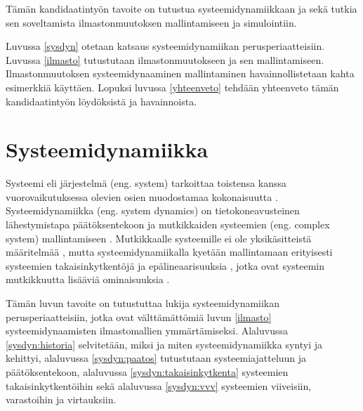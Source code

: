 \documentclass[finnish,12pt,a4paper,pdftex]{article}
\begin{document}
\begin{onehalfspacing}

Tämän kandidaatintyön tavoite on tutustua systeemidynamiikkaan ja sekä tutkia sen soveltamista ilmastonmuutoksen mallintamiseen ja simulointiin. 



Luvussa \ref{sysdyn} otetaan katsaus systeemidynamiikan perusperiaatteisiin. Luvussa \ref{ilmasto} tutustutaan ilmastonmuutokseen ja sen mallintamiseen. Ilmastonmuutoksen systeemidynaaminen mallintaminen havainnollistetaan kahta esimerkkiä käyttäen. Lopuksi luvussa \ref{yhteenveto} tehdään yhteenveto tämän kandidaatintyön löydöksistä ja havainnoista. 

\clearpage

\section{Systeemidynamiikka \label{sysdyn}}

Systeemi eli järjestelmä (eng. system) tarkoittaa toistensa kanssa vuorovaikutuksessa olevien osien muodostamaa kokonaisuutta \cite{Flood1988}. Systeemidynamiikka (eng. system dynamics) on tietokoneavusteinen lähestymistapa päätöksentekoon ja mutkikkaiden systeemien (eng. complex system) mallintamiseen \cite{WhatIsSystemDynamics}. Mutkikkaalle systeemille ei ole yksikäsitteistä määritelmää \cite{Zadeh1973}, mutta systeemidynamiikalla kyetään mallintamaan erityisesti systeemien takaisinkytkentöjä ja epälineaarisuuksia \cite{WhatIsSystemDynamics}, jotka ovat systeemin mutkikkuutta lisääviä ominaisuuksia \cite{Zadeh1973}. 

Tämän luvun tavoite on tutustuttaa lukija systeemidynamiikan perusperiaatteisiin, jotka ovat välttämättömiä luvun \ref{ilmasto} systeemidynaamisten ilmastomallien ymmärtämiseksi. Alaluvussa \ref{sysdyn:historia} selvitetään, miksi ja miten systeemidynamiikka syntyi ja kehittyi, alaluvussa \ref{sysdyn:paatos} tutustutaan systeemiajatteluun ja päätöksentekoon, alaluvussa \ref{sysdyn:takaisinkytkenta} systeemien takaisinkytkentöihin sekä alaluvussa \ref{sysdyn:vvv} systeemien viiveisiin, varastoihin ja virtauksiin. 


\end{onehalfspacing}
\end{document}

